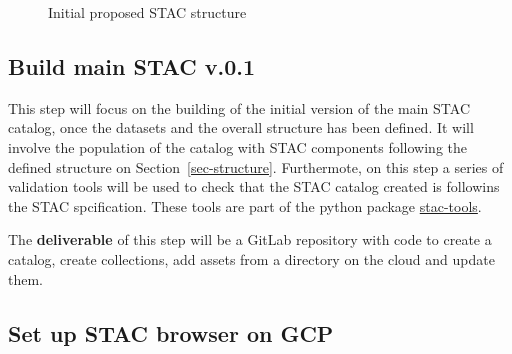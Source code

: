 \documentclass[
  oneside,
  open=any]{scrbook}
\begin{document}
\begin{figure}[H]


\caption{\label{fig-stac-str}Initial proposed STAC structure}

\end{figure}%

\subsection{Build main STAC v.0.1}\label{build-main-stac-v.0.1}

This step will focus on the building of the initial version of the main
STAC catalog, once the datasets and the overall structure has been
defined. It will involve the population of the catalog with STAC
components following the defined structure on
Section~\ref{sec-structure}. Furthermote, on this step a series of
validation tools will be used to check that the STAC catalog created is
followins the STAC spcification. These tools are part of the python
package \href{https://github.com/stac-utils/stactools}{stac-tools}.

The \textbf{deliverable} of this step will be a GitLab repository with
code to create a catalog, create collections, add assets from a
directory on the cloud and update them.

\subsection{Set up STAC browser on
GCP}\label{set-up-stac-browser-on-gcp}
\end{document}
